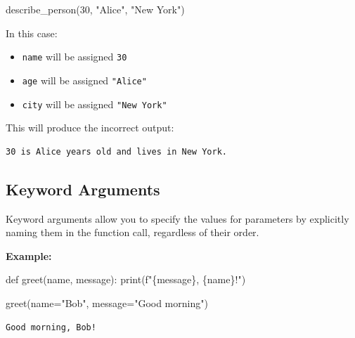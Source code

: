 \documentclass[
  letterpaper,
  DIV=11,
  numbers=noendperiod]{scrreprt}
\newenvironment{Shaded}{\begin{snugshade}}{\end{snugshade}}
\newcommand{\BuiltInTok}[1]{\textcolor[rgb]{0.00,0.23,0.31}{#1}}
\newcommand{\DecValTok}[1]{\textcolor[rgb]{0.68,0.00,0.00}{#1}}
\newcommand{\KeywordTok}[1]{\textcolor[rgb]{0.00,0.23,0.31}{#1}}
\newcommand{\NormalTok}[1]{\textcolor[rgb]{0.00,0.23,0.31}{#1}}
\newcommand{\OperatorTok}[1]{\textcolor[rgb]{0.37,0.37,0.37}{#1}}
\newcommand{\SpecialCharTok}[1]{\textcolor[rgb]{0.37,0.37,0.37}{#1}}
\newcommand{\SpecialStringTok}[1]{\textcolor[rgb]{0.13,0.47,0.30}{#1}}
\newcommand{\StringTok}[1]{\textcolor[rgb]{0.13,0.47,0.30}{#1}}
\providecommand{\tightlist}{%
  \setlength{\itemsep}{0pt}\setlength{\parskip}{0pt}}\usepackage{longtable,booktabs,array}
\begin{document}
\begin{Shaded}
\begin{Highlighting}[]
\NormalTok{describe\_person(}\DecValTok{30}\NormalTok{, }\StringTok{"Alice"}\NormalTok{, }\StringTok{"New York"}\NormalTok{)}
\end{Highlighting}
\end{Shaded}

In this case:

\begin{itemize}
\tightlist
\item
  \texttt{name} will be assigned \texttt{30}
\item
  \texttt{age} will be assigned \texttt{"Alice"}
\item
  \texttt{city} will be assigned \texttt{"New\ York"}
\end{itemize}

This will produce the incorrect output:

\begin{verbatim}
30 is Alice years old and lives in New York.
\end{verbatim}

\hypertarget{keyword-arguments}{%
\subsection{Keyword Arguments}\label{keyword-arguments}}

Keyword arguments allow you to specify the values for parameters by
explicitly naming them in the function call, regardless of their order.

\textbf{Example:}

\begin{Shaded}
\begin{Highlighting}[]
\KeywordTok{def}\NormalTok{ greet(name, message):}
    \BuiltInTok{print}\NormalTok{(}\SpecialStringTok{f"}\SpecialCharTok{\{}\NormalTok{message}\SpecialCharTok{\}}\SpecialStringTok{, }\SpecialCharTok{\{}\NormalTok{name}\SpecialCharTok{\}}\SpecialStringTok{!"}\NormalTok{)}

\NormalTok{greet(name}\OperatorTok{=}\StringTok{"Bob"}\NormalTok{, message}\OperatorTok{=}\StringTok{"Good morning"}\NormalTok{) }
\end{Highlighting}
\end{Shaded}

\begin{verbatim}
Good morning, Bob!
\end{verbatim}
\end{document}

